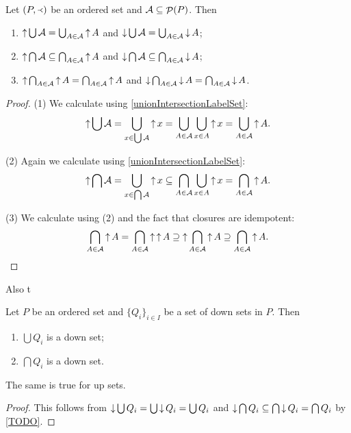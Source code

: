 \begin{corollary} \label{upDownsetUnionIntersection}
Let $\left( P,\Yleft \right)$ be an ordered set and $\mathcal{A}\subseteq \mathop{\mathcal{P}}(P)$. Then
\begin{enumerate}
\item $\mathop{\uparrow} \bigcup \mathcal{A} = \bigcup_{A\in \mathcal{A}} \mathop{\uparrow} A$ and $\mathop{\downarrow} \bigcup \mathcal{A} = \bigcup_{A\in \mathcal{A}} \mathop{\downarrow} A$;
\item $\mathop{\uparrow} \bigcap \mathcal{A} \subseteq \bigcap_{A\in \mathcal{A}} \mathop{\uparrow} A$ and $\mathop{\downarrow} \bigcap \mathcal{A} \subseteq \bigcap_{A\in \mathcal{A}} \mathop{\downarrow} A$;
\item $\mathop{\uparrow} \bigcap_{A\in \mathcal{A}} \mathop{\uparrow} A = \bigcap_{A\in \mathcal{A}} \mathop{\uparrow} A$ and $\mathop{\downarrow} \bigcap_{A\in \mathcal{A}} \mathop{\downarrow} A = \bigcap_{A\in \mathcal{A}} \mathop{\downarrow} A$.
\end{enumerate}
\end{corollary}
\begin{proof}
(1) We calculate using \ref{unionIntersectionLabelSet}:
\[ \mathop{\uparrow} \bigcup \mathcal{A} = \bigcup_{x\in \bigcup\mathcal{A}} \mathop{\uparrow} x = \bigcup_{A\in \mathcal{A}}\bigcup_{x\in A}\mathop{\uparrow} x = \bigcup_{A\in \mathcal{A}} \mathop{\uparrow} A. \]

(2) Again we calculate using \ref{unionIntersectionLabelSet}:
\[ \mathop{\uparrow} \bigcap \mathcal{A} = \bigcup_{x\in \bigcap\mathcal{A}} \mathop{\uparrow} x \subseteq \bigcap_{A\in \mathcal{A}}\bigcup_{x\in A}\mathop{\uparrow} x = \bigcap_{A\in \mathcal{A}} \mathop{\uparrow} A. \]

(3) We calculate using (2) and the fact that closures are idempotent:
\[ \bigcap_{A\in \mathcal{A}} \mathop{\uparrow} A = \bigcap_{A\in \mathcal{A}} \mathop{\uparrow}\mathop{\uparrow} A \supseteq \mathop{\uparrow} \bigcap_{A\in \mathcal{A}} \mathop{\uparrow} A \supseteq \bigcap_{A\in \mathcal{A}} \mathop{\uparrow} A. \]
\end{proof}
Also t
\begin{corollary} \label{unionIntersectionDownUpSets}
Let $P$ be an ordered set and $\{Q_i\}_{i\in I}$ be a set of down sets in $P$. Then
\begin{enumerate}
\item $\bigcup Q_i$ is a down set;
\item $\bigcap Q_i$ is a down set.
\end{enumerate}
The same is true for up sets.
\end{corollary}
\begin{proof}
This follows from $\mathop{\downarrow} \bigcup Q_i = \bigcup \mathop{\downarrow} Q_i = \bigcup Q_i$ and $\mathop{\downarrow} \bigcap Q_i \subseteq \bigcap \mathop{\downarrow} Q_i = \bigcap Q_i$ by \ref{TODO}.
\end{proof}


